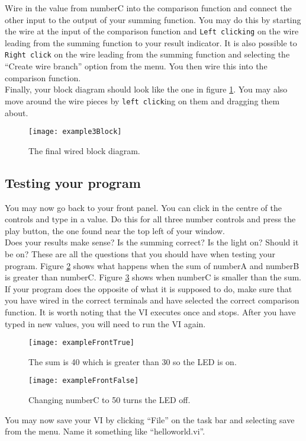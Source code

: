 	Wire in the value from numberC into the comparison function and connect the other input to the output of your summing function. You may do this by starting the wire at the input of the comparison function and \texttt{Left clicking} on the wire leading from the summing function to your result indicator. It is also possible to \texttt{Right click} on the wire leading from the summing function and selecting the ``Create wire branch'' option from the menu. You then wire this into the comparison function.\\
	
	Finally, your block diagram should look like the one in figure \ref{example3Block}. You may also move around the wire pieces by \texttt{left click}ing on them and dragging them about.\\
	\begin{figure}
		\centering
		\texttt{[image: example3Block]}
		\caption{The final wired block diagram.}
		\label{example3Block}
	\end{figure}

	\subsection{Testing your program}
	You may now go back to your front panel. You can click in the centre of the controls and type in a value. Do this for all three number controls and press the play button, the one found near the top left of your window.\\
	
	Does your results make sense? Is the summing correct? Is the light on? Should it be on? These are all the questions that you should have when testing your program. Figure \ref{exampleFrontTrue} shows what happens when the sum of numberA and numberB is greater than numberC. Figure \ref{exampleFrontFalse} shows when numberC is smaller than the sum. If your program does the opposite of what it is supposed to do, make sure that you have wired in the correct terminals and have selected the correct comparison function. It is worth noting that the VI executes once and stops. After you have typed in new values, you will need to run the VI again.\\
	\begin{figure}
		\centering
		\texttt{[image: exampleFrontTrue]}
		\caption{The sum is 40 which is greater than 30 so the LED is on.}
		\label{exampleFrontTrue}
	\end{figure}
	\begin{figure}
		\centering
		\texttt{[image: exampleFrontFalse]}
		\caption{Changing numberC to 50 turns the LED off.}
		\label{exampleFrontFalse}
	\end{figure}

	You may now save your VI by clicking ``File'' on the task bar and selecting save from the menu. Name it something like ``helloworld.vi''.\\ 
	
	
